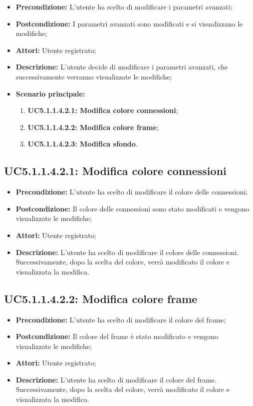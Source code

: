 \begin{itemize}
	\item \textbf{Precondizione:} L'utente ha scelto di modificare i parametri avanzati;
	\item \textbf{Postcondizione:} I parametri avanzati sono modificati e si visualizzano le modifiche;
	\item \textbf{Attori:} Utente registrato;
	\item \textbf{Descrizione:} L'utente decide di modificare i parametri avanzati, che successivamente verranno visualizzate le modifiche;
	\item \textbf{Scenario principale:}
	\begin{enumerate}
		\item \textbf{ UC5.1.1.4.2.1: Modifica colore connessioni};
		\item \textbf{ UC5.1.1.4.2.2: Modifica colore frame};
		\item \textbf{ UC5.1.1.4.2.3: Modifica sfondo}.
	\end{enumerate}
\end{itemize}
\subsection{ UC5.1.1.4.2.1: Modifica colore connessioni}

\begin{itemize}
	\item \textbf{Precondizione:} L'utente ha scelto di modificare il colore delle connessioni;
	\item \textbf{Postcondizione:} Il colore delle connessioni sono stato modificati e vengono visualizzate le modifiche;
	\item \textbf{Attori:} Utente registrato;
	\item \textbf{Descrizione:} L'utente ha scelto di modificare il colore delle connessioni.  Successivamente, dopo la scelta del colore, verrà modificato il colore e visualizzata la modifica.
\end{itemize}
\subsection{ UC5.1.1.4.2.2: Modifica colore frame}

\begin{itemize}
	\item \textbf{Precondizione:} L'utente ha scelto di modificare il colore del frame;
	\item \textbf{Postcondizione:} Il colore del frame è stato modificato e vengono visualizzate le modifiche;
	\item \textbf{Attori:} Utente registrato;
	\item \textbf{Descrizione:} L'utente ha scelto di modificare il colore del frame.  Successivamente, dopo la scelta del colore, verrà modificato il colore e visualizzata la modifica.
\end{itemize}
